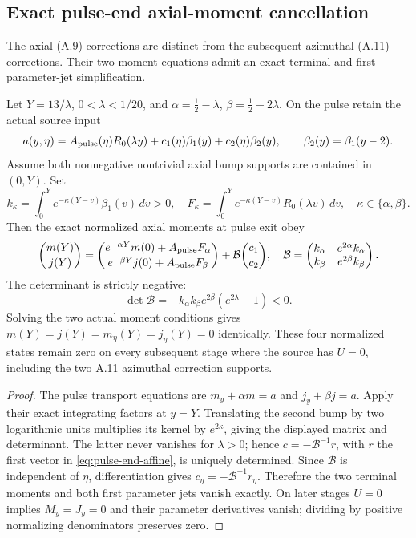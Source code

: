 \subsection*{Exact pulse-end axial-moment cancellation}
The axial (A.9) corrections are distinct from the subsequent azimuthal
(A.11) corrections. Their two moment equations admit an exact
terminal and first-parameter-jet simplification.

\begin{theorem}
\label{thm:pulse-end-annihilation}
Let $Y=13/\lambda$, $0<\lambda<1/20$, and
$\alpha=\tfrac12-\lambda$, $\beta=\tfrac12-2\lambda$.
On the pulse retain the actual source input
\[
 a(y,\eta)=A_{\rm pulse}(\eta)R_0(\lambda y)
       +c_1(\eta)\beta_1(y)+c_2(\eta)\beta_2(y),
 \qquad \beta_2(y)=\beta_1(y-2).
\]
Assume both nonnegative nontrivial axial bump supports are contained
in $(0,Y)$. Set
\[
 k_\kappa=\int_0^Y e^{-\kappa(Y-v)}\beta_1(v)\,dv>0,\quad
 F_\kappa=\int_0^Y e^{-\kappa(Y-v)}R_0(\lambda v)\,dv,
 \quad \kappa\in\{\alpha,\beta\}.
\]
Then the exact normalized axial moments at pulse exit obey
\begin{equation}\label{eq:pulse-end-affine}
 \binom{m(Y)}{j(Y)}
 =\binom{e^{-\alpha Y}m(0)+A_{\rm pulse}F_\alpha}
             {e^{-\beta Y}j(0)+A_{\rm pulse}F_\beta}
 +\mathcal B\binom{c_1}{c_2},\quad
 \mathcal B=\begin{pmatrix}
 k_\alpha&e^{2\alpha}k_\alpha\\
 k_\beta&e^{2\beta}k_\beta
 \end{pmatrix}.
\end{equation}
The determinant is strictly negative:
\[
 \det\mathcal B=-k_\alpha k_\beta e^{2\beta}
                    (e^{2\lambda}-1)<0.
\]
Solving the two actual moment conditions gives
$m(Y)=j(Y)=m_\eta(Y)=j_\eta(Y)=0$ identically.
These four normalized states remain zero on every subsequent
stage where the source has $U=0$, including the two A.11
azimuthal correction supports.
\end{theorem}
\begin{proof}
The pulse transport equations are $m_y+\alpha m=a$ and
$j_y+\beta j=a$. Apply their exact integrating factors at
$y=Y$. Translating the second bump by two logarithmic units
multiplies its kernel by $e^{2\kappa}$, giving the displayed
matrix and determinant. The latter never vanishes for
$\lambda>0$; hence $c=-\mathcal B^{-1}r$, with $r$ the first
vector in \eqref{eq:pulse-end-affine}, is uniquely determined.
Since $\mathcal B$ is independent of $\eta$, differentiation
gives $c_\eta=-\mathcal B^{-1}r_\eta$. Therefore the two
terminal moments and both first parameter jets vanish
exactly. On later stages $U=0$ implies $M_y=J_y=0$ and
their parameter derivatives vanish; dividing by positive
normalizing denominators preserves zero.
\end{proof}

